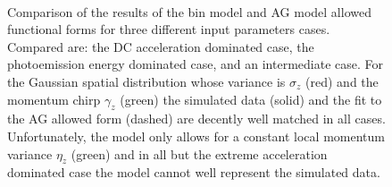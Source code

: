 \begin{figure}
  \centerline {
    \subfloat[][]{
      \label{fig:bin_model_acc}
      \begin{tikzpicture}
        
      \end{tikzpicture}
    }
    \subfloat[][]{
      \label{fig:bin_model_vmax}
      \begin{tikzpicture}
        
      \end{tikzpicture}
    }
    \\
  }
  \centerline{
    \subfloat[][]{
      \label{fig:bin_model_equal}
      \begin{tikzpicture}
        
      \end{tikzpicture}
    }
  }
  \caption[Results of bin model for computing initial conditions]{
    Comparison of the results of the bin model and AG model allowed functional forms for three different input parameters cases.
    Compared are:  the DC acceleration dominated case,  the photoemission energy dominated case, and  an intermediate case.
    For the Gaussian spatial distribution whose variance is $\sigma_z$ (red) and the momentum chirp $\gamma_z$ (green) the simulated data (solid) and the fit to the AG allowed form (dashed) are decently well matched in all cases.
    Unfortunately, the model only allows for a constant local momentum variance $\eta_z$ (green) and in all but the extreme acceleration dominated case  the model cannot well represent the simulated data.
  }
  \label{fig:bin_model}
\end{figure}
